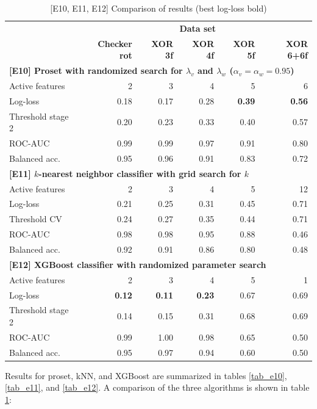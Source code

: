 %
\begin{table}
\caption{[E10, E11, E12] Comparison of results (best log-loss bold)}
\label{tab_e10_e11_e12}
%
\begin{center}
\small
\begin{tabular}{|lrrrrr|}
\hline
&\multicolumn{5}{c|}{\textbf{\hrulefill\ Data set \hrulefill}}\\
&\textbf{Checker rot}&\textbf{XOR 3f}&\textbf{XOR 4f}&\textbf{XOR 5f}&\textbf{XOR 6+6f}\\
\multicolumn{6}{|l|}{\textbf{[E10] Proset with randomized search for $\lambda_v$ and $\lambda_w$ ($\alpha_v=\alpha_w=0.95$)}}\\
Active features&2&3&4&5&6\\
Log-loss&0.18&0.17&0.28&\textbf{0.39}&\textbf{0.56}\\
Threshold stage 2&0.20&0.23&0.33&0.40&0.57\\
ROC-AUC&0.99&0.99&0.97&0.91&0.80\\
Balanced acc.&0.95&0.96&0.91&0.83&0.72\\
\multicolumn{6}{|l|}{\textbf{[E11] $k$-nearest neighbor classifier with grid search for $k$}}\\
Active features&2&3&4&5&12\\
Log-loss&0.21&0.25&0.31&0.45&0.71\\
Threshold CV&0.24&0.27&0.35&0.44&0.71\\
ROC-AUC&0.98&0.98&0.95&0.88&0.46\\
Balanced acc.&0.92&0.91&0.86&0.80&0.48\\
\multicolumn{6}{|l|}{\textbf{[E12] XGBoost classifier with randomized parameter search}}\\
Active features&2&3&4&5&1\\
Log-loss&\textbf{0.12}&\textbf{0.11}&\textbf{0.23}&0.67&0.69\\
Threshold stage 2&0.14&0.15&0.31&0.68&0.69\\
ROC-AUC&0.99&1.00&0.98&0.65&0.50\\
Balanced acc.&0.95&0.97&0.94&0.60&0.50\\
\hline
\end{tabular}
\end{center}
\end{table}
%
\clearpage
%
Results for proset, kNN, and XGBoost are summarized in tables \ref{tab_e10}, \ref{tab_e11}, and \ref{tab_e12}.
A comparison of the three algorithms is shown in table \ref{tab_e10_e11_e12}:
%
